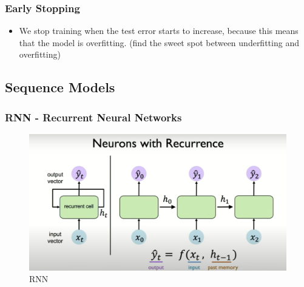 \documentclass{article}
\begin{document}
\subsubsection{Early Stopping}
\begin{itemize}
  \item We stop training when the test error starts to increase, because this means that the model is overfitting. (find the sweet spot between underfitting and overfitting)
\end{itemize}
\subsection*{Sequence Models}
\subsubsection*{RNN - Recurrent Neural Networks}
\begin{figure}[H]
  \centering
  \includegraphics[width = \textwidth]{Images/rnn.png}
  \caption{RNN}
\end{figure}
\end{document}
